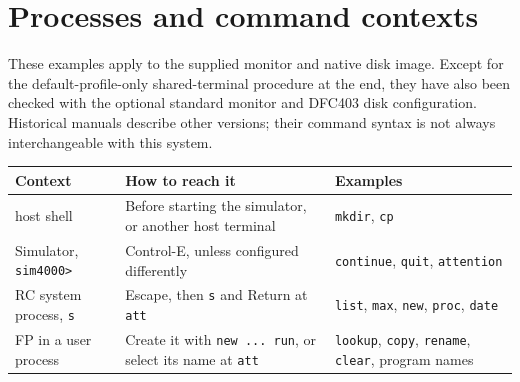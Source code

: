 \chapter{Processes and command contexts}\label{processes-and-command-contexts}

These examples apply to the supplied monitor and native disk image. Except for the default-profile-only shared-terminal procedure at the end, they have also been checked with the optional standard monitor and DFC403 disk configuration. Historical manuals describe other versions; their command syntax is not always interchangeable with this system.

\begin{longtable}[]{@{}
  >{\raggedright\arraybackslash}p{}
  >{\raggedright\arraybackslash}p{}
  >{\raggedright\arraybackslash}p{}@{}}
\toprule\noalign{}
\begin{minipage}[b]{\linewidth}\raggedright
Context
\end{minipage} & \begin{minipage}[b]{\linewidth}\raggedright
How to reach it
\end{minipage} & \begin{minipage}[b]{\linewidth}\raggedright
Examples
\end{minipage} \\
\midrule\noalign{}
\endhead
\bottomrule\noalign{}
\endlastfoot
host shell & Before starting the simulator, or another host terminal & \passthrough{\lstinline!mkdir!}, \passthrough{\lstinline!cp!} \\
Simulator, \passthrough{\lstinline!sim4000>!} & Control-E, unless configured differently & \passthrough{\lstinline!continue!}, \passthrough{\lstinline!quit!}, \passthrough{\lstinline!attention!} \\
RC system process, \passthrough{\lstinline!s!} & Escape, then \passthrough{\lstinline!s!} and Return at \passthrough{\lstinline!att!} & \passthrough{\lstinline!list!}, \passthrough{\lstinline!max!}, \passthrough{\lstinline!new!}, \passthrough{\lstinline!proc!}, \passthrough{\lstinline!date!} \\
FP in a user process & Create it with \passthrough{\lstinline!new ... run!}, or select its name at \passthrough{\lstinline!att!} & \passthrough{\lstinline!lookup!}, \passthrough{\lstinline!copy!}, \passthrough{\lstinline!rename!}, \passthrough{\lstinline!clear!}, program names \\
\end{longtable}


